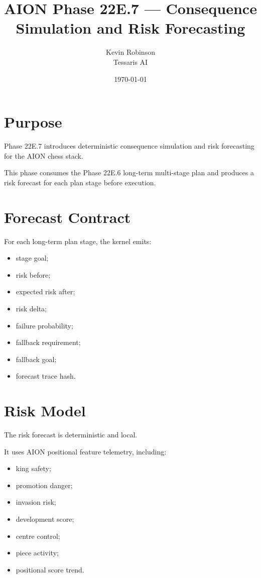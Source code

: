 \documentclass[11pt,a4paper]{article}
\title{\textbf{AION Phase 22E.7 --- Consequence Simulation and Risk Forecasting}}
\author{Kevin Robinson\\Tessaris AI}
\date{\today}
\begin{document}
\maketitle

\section{Purpose}

Phase 22E.7 introduces deterministic consequence simulation and risk forecasting for the AION chess stack.

This phase consumes the Phase 22E.6 long-term multi-stage plan and produces a risk forecast for each plan stage before execution.

\section{Forecast Contract}

For each long-term plan stage, the kernel emits:

\begin{itemize}[leftmargin=*]
  \item stage goal;
  \item risk before;
  \item expected risk after;
  \item risk delta;
  \item failure probability;
  \item fallback requirement;
  \item fallback goal;
  \item forecast trace hash.
\end{itemize}

\section{Risk Model}

The risk forecast is deterministic and local.

It uses AION positional feature telemetry, including:

\begin{itemize}[leftmargin=*]
  \item king safety;
  \item promotion danger;
  \item invasion risk;
  \item development score;
  \item centre control;
  \item piece activity;
  \item positional score trend.
\end{itemize}
\end{document}
